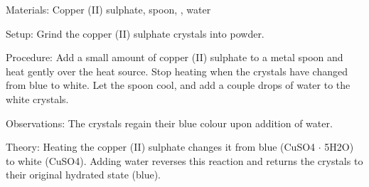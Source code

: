 \begin{multicols}{2}
\begin{description*}
\item[Materials:]{Copper (II) sulphate, spoon, , water}
\item[Setup:]{Grind the copper (II) sulphate crystals into powder.}
\item[Procedure:]{Add a small amount of copper (II) sulphate to a metal spoon and heat gently over the heat source. Stop heating when the crystals have changed from blue to white. Let the spoon cool, and add a couple drops of water to the white crystals.}
\item[Observations:]{The crystals regain their blue colour upon addition of water.}
\item[Theory:]{Heating the copper (II) sulphate changes it from blue (\ce CuSO4 $\cdot$ 5H2O) to white (\ce CuSO4). Adding water reverses this reaction and returns the crystals to their original hydrated state (blue).}
\end{description*}



\end{multicols}
